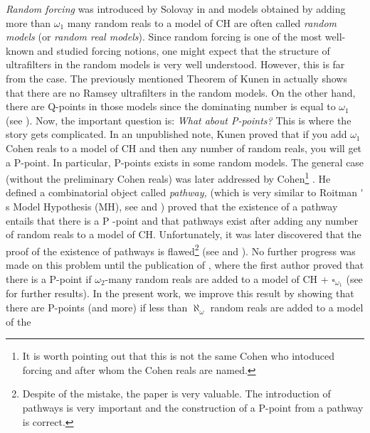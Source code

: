 \documentclass{article}%
\providecommand{\U}[1]{\protect\rule{.1in}{.1in}}
\begin{document}
\emph{Random forcing }was introduced by Solovay in \cite{SolovayModelOriginal}
and models obtained by adding more than $\omega_{1}$ many random reals to a
model of \textsf{CH }are often called \emph{random models }(or \emph{random
real models}).\emph{ }Since random forcing is one of the most well-known and
studied forcing notions, one might expect that the structure of ultrafilters
in the random models is very well understood. However, this is far from the
case. The previously mentioned Theorem of Kunen in \cite{KunenSomePoints}
actually shows that there are no Ramsey ultrafilters in the random models. On
the other hand, there are \textsf{Q}-points in those models since the
dominating number is equal to $\omega_{1}$ (see \cite{HandbookBlass}). Now,
the important question is:\textit{ What about \textsf{P}-points? }This is
where the story gets complicated. In an unpublished note, Kunen proved that if
you add $\omega_{1}$ Cohen reals to a model of \textsf{CH }and then\textsf{
}any number of random reals, you will get a \textsf{P}-point. In particular,
\textsf{P}-points exists in some random models. The general case (without the
preliminary Cohen reals) was later addressed by Cohen\footnote{It is worth
pointing out that this is not the same Cohen who intoduced forcing and after
whom the Cohen reals are named.} \cite{PpointsinRandomUniverses}. He defined a
combinatorial object called \emph{pathway,} (which is very similar to Roitman%
\'{}%
s Model Hypothesis (\textsf{MH}), see
\cite{ParacompactnessinProductsOldandNew} and \cite{RotimanPrincipleHM})
proved that the existence of a pathway entails that there is a \textsf{P}%
-point and that pathways exist after adding any number of random reals to a
model of \textsf{CH. }Unfortunately, it was later discovered that the proof of
the existence of pathways is flawed\footnote{Despite of the mistake, the paper
\cite{PpointsinRandomUniverses} is very valuable. The introduction of pathways
is very important and the construction of a \textsf{P}-point from a pathway is
correct.} (see \cite{GruffCorrigendum} and
\cite{TherearenoPpointsinSilverExtensions}). No further progress was made on
this problem until the publication of \cite{PFiltersCohenRandomLaver}, where
the first author proved that there is a \textsf{P}-point if $\omega_{2}$-many
random reals are added to a model of \textsf{CH + }$\square_{\omega_{1}}$ (see
\cite{ParacompactnessinProductsOldandNew} for further results). In the present
work, we improve this result by showing that there are \textsf{P}-points (and
more) if less than $\aleph_{\omega}$ random reals are added to a model of the
\end{document}
